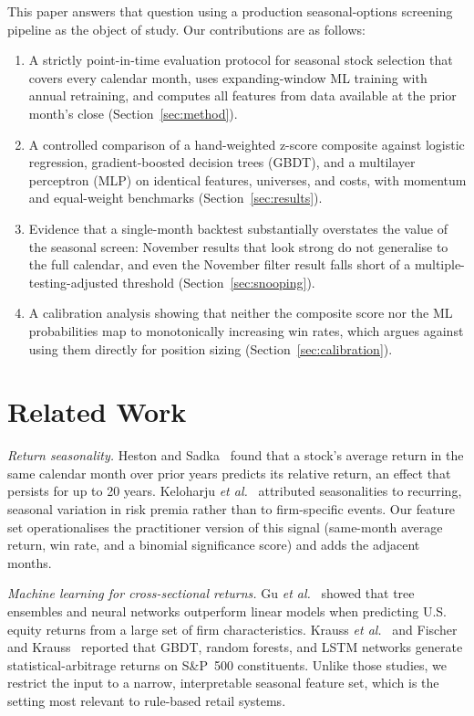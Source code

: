 \documentclass[conference]{IEEEtran}
\begin{document}
This paper answers that question using a production seasonal-options screening pipeline as the object of study. Our contributions are as follows:
\begin{enumerate}
\item A strictly point-in-time evaluation protocol for seasonal stock selection that covers every calendar month, uses expanding-window ML training with annual retraining, and computes all features from data available at the prior month's close (Section~\ref{sec:method}).
\item A controlled comparison of a hand-weighted z-score composite against logistic regression, gradient-boosted decision trees (GBDT), and a multilayer perceptron (MLP) on identical features, universes, and costs, with momentum and equal-weight benchmarks (Section~\ref{sec:results}).
\item Evidence that a single-month backtest substantially overstates the value of the seasonal screen: November results that look strong do not generalise to the full calendar, and even the November filter result falls short of a multiple-testing-adjusted threshold (Section~\ref{sec:snooping}).
\item A calibration analysis showing that neither the composite score nor the ML probabilities map to monotonically increasing win rates, which argues against using them directly for position sizing (Section~\ref{sec:calibration}).
\end{enumerate}

\section{Related Work}

\textit{Return seasonality.} Heston and Sadka~\cite{heston2008} found that a stock's average return in the same calendar month over prior years predicts its relative return, an effect that persists for up to 20 years. Keloharju \emph{et al.}~\cite{keloharju2016} attributed seasonalities to recurring, seasonal variation in risk premia rather than to firm-specific events. Our feature set operationalises the practitioner version of this signal (same-month average return, win rate, and a binomial significance score) and adds the adjacent months.

\textit{Machine learning for cross-sectional returns.} Gu \emph{et al.}~\cite{gu2020} showed that tree ensembles and neural networks outperform linear models when predicting U.S. equity returns from a large set of firm characteristics. Krauss \emph{et al.}~\cite{krauss2017} and Fischer and Krauss~\cite{fischer2018} reported that GBDT, random forests, and LSTM networks generate statistical-arbitrage returns on S\&P~500 constituents. Unlike those studies, we restrict the input to a narrow, interpretable seasonal feature set, which is the setting most relevant to rule-based retail systems.
\end{document}
